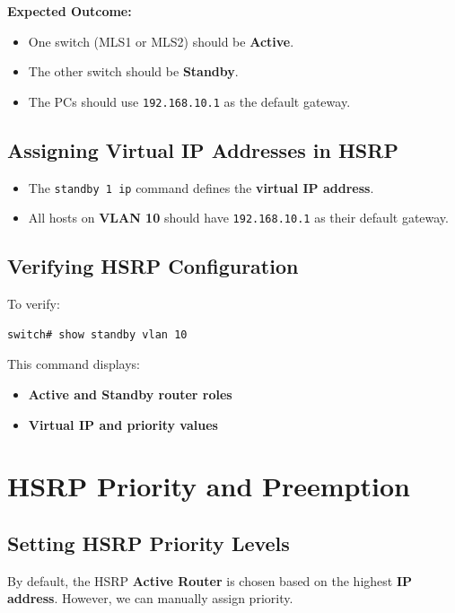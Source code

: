 \documentclass[a4paper]{book}
\begin{document}
\textbf{Expected Outcome:}
\begin{itemize}
\item One switch (MLS1 or MLS2) should be \textbf{Active}.
\item The other switch should be \textbf{Standby}.
\item The PCs should use \texttt{192.168.10.1} as the default gateway.
\end{itemize}

\subsection{Assigning Virtual IP Addresses in HSRP}
\begin{itemize}
\item The \texttt{standby 1 ip} command defines the \textbf{virtual IP address}.
\item All hosts on \textbf{VLAN 10} should have \texttt{192.168.10.1} as their 
default gateway.
\end{itemize}

\subsection{Verifying HSRP Configuration}
To verify:
\begin{lstlisting}
switch# show standby vlan 10
\end{lstlisting}
This command displays:
\begin{itemize}
\item \textbf{Active and Standby router roles}
\item \textbf{Virtual IP and priority values}
\end{itemize}


\vspace{1.5em}

\section{HSRP Priority and Preemption}

\subsection{Setting HSRP Priority Levels}
By default, the HSRP \textbf{Active Router} is chosen based on the highest \textbf{IP address}. 
However, we can manually assign priority.
\end{document}
